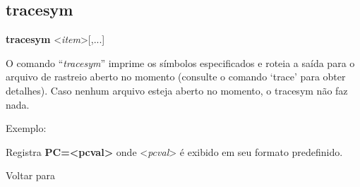 \documentclass[letterpaper,10pt,brazil]{sphinxmanual}
\begin{document}
\subsection{tracesym}
\label{debugger/general:tracesym}\label{debugger/general:debugger-command-tracesym}
\begin{DUlineblock}{0em}
\item[]
\begin{DUlineblock}{\DUlineblockindent}
\item[] \textbf{tracesym} \textless{}\emph{item}\textgreater{}{[},...{]}
\item[] 
\end{DUlineblock}
\item[] O comando ``\emph{tracesym}'' imprime os símbolos especificados e roteia a saída para o arquivo de rastreio aberto no momento (consulte o comando `trace' para obter detalhes). Caso nenhum arquivo esteja aberto no momento, o tracesym não faz nada.
\item[] 
\item[] Exemplo:
\item[] 
\item[]
\begin{DUlineblock}{\DUlineblockindent}
\item[] 
\item[] 
\end{DUlineblock}
\item[] Registra \textbf{PC=\textless{}pcval\textgreater{}} onde \textless{}\emph{pcval}\textgreater{} é exibido em seu formato predefinido.
\item[] 
\item[] Voltar para {\hyperref[debugger/general:debugger\string-general\string-list]{}}
\end{DUlineblock}
\begin{quote}
\label{debugger/general:debugger-command-trackpc}\end{quote}
\end{document}

